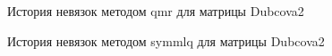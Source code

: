 \begin{figure}[H]
    \renewcommand{\figurename}{Рисунок}
    \caption{История невязок методом qmr для матрицы Dubcova2}
    \label{fig:image_9}
\end{figure}

\begin{figure}[H]
    \renewcommand{\figurename}{Рисунок}
    \caption{История невязок методом symmlq для матрицы Dubcova2}
    \label{fig:image_10}
\end{figure}

